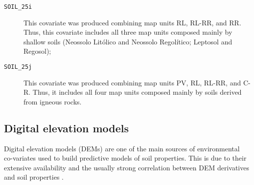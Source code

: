 \begin{description}
  \item[\texttt{SOIL\_25i}] This covariate was produced combining map units RL, RL-RR, and RR. Thus, this covariate includes all three map units composed mainly by shallow soils (Neossolo Litólico and Neossolo Regolítico; Leptosol and Regosol);
  
  \item[\texttt{SOIL\_25j}] This covariate was produced combining map units PV, RL, RL-RR, and C-R. Thus, it includes all four map units composed mainly by soils derived from igneous rocks.
\end{description}


\tocless\subsection{Digital elevation models}\label{sec:dem}

Digital elevation models (DEMs) are one of the main sources of environmental co-variates used to build predictive models of soil properties. This is due to their extensive availability and the usually strong correlation between DEM derivatives and soil properties \cite{BishopEtAl2001, Grunwald2009}.

